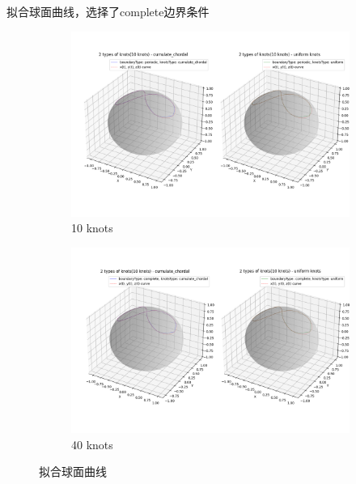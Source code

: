\documentclass[UTF8]{ctexart}
\begin{document}
拟合球面曲线，选择了complete边界条件
\begin{figure}[H]
	\centering
	\begin{subfigure}[b]{0.45\textwidth}
		\centering
		\includegraphics[width=\textwidth]{../figure/plot_1.png}
		\caption{10 knots}
		\label{fig:image1}
	\end{subfigure}
	\hspace{0.5cm}  %
	\begin{subfigure}[b]{0.45\textwidth}
		\centering
		\includegraphics[width=\textwidth]{../figure/plot_3.png}
		\caption{40 knots}
		\label{fig:image2}
	\end{subfigure}
	\caption{拟合球面曲线}  %
	\label{fig:two_images}
\end{figure}
\end{document}
